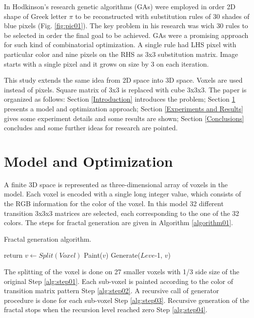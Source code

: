 \documentclass{llncs}
\begin{document}
In Hodkinson's research genetic algorithms (GAs) were employed in order 2D shape of Greek letter $\pi$ to be reconstructed with substitution rules of 30 shades of blue pixels (Fig. \ref{fig:pic01}). The key problem in his research was wich 30 rules to be selected in order the final goal to be achieved. GAs were a promising approach for such kind of combinatorial optimization. A single rule had LHS pixel with particular color and nine pixels on the RHS as 3x3 substitution matrix. Image starts with a single pixel and it grows on size by 3 on each iteration. 

This study extends the same idea from 2D space into 3D space. Voxels are used instead of pixels. Square matrix of 3x3 is replaced with cube 3x3x3. The paper is organized as follows: Section \ref{Introduction} introduces the problem; Section \ref{Model and Optimization} presents a model and optimization approach; Section \ref{Experiments and Results} gives some experiment details and some results are shown; Section \ref{Conclusions} concludes and some further ideas for research are pointed.

\section{Model and Optimization} \label{Model and Optimization}

A finite 3D space is represented as three-dimensional array of voxels in the model. Each voxel is encoded with a single long integer value, which consists of the RGB information for the color of the voxel. In this model 32 different transition 3x3x3 matrices are selected, each corresponding to the one of the 32 colors. The steps for fractal generation are given in Algorithm \ref{algorithm01}.

\begin{algorithm}
\caption{Fractal generation algorithm.}\label{algorithm01}
\begin{algorithmic}[1]
  \State return\label{alg:step04}
\EndIf
\State $v\gets Split(Voxel)$\label{alg:step01}
  \State Paint($v$)\label{alg:step02}
  \State Generate($Leve$-1, $v$)\label{alg:step03}
\EndFor
\EndProcedure
\end{algorithmic}
\end{algorithm}
\FloatBarrier

The splitting of the voxel is done on 27 smaller voxels with 1/3 side size of the original Step \ref{alg:step01}. Each sub-voxel is painted according to the color of transition matrix pattern Step \ref{alg:step02}. A recursive call of generator procedure is done for each sub-voxel Step \ref{alg:step03}. Recursive generation of the fractal stops when the recursion level reached zero Step \ref{alg:step04}.
\end{document}
